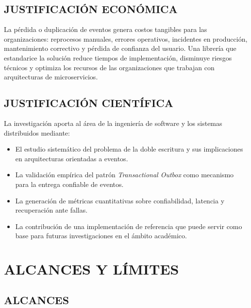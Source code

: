 \subsection{JUSTIFICACIÓN ECONÓMICA}

La pérdida o duplicación de eventos genera costos tangibles para las organizaciones: reprocesos manuales, errores operativos, incidentes en producción, mantenimiento correctivo y pérdida de confianza del usuario. Una librería que estandarice la solución reduce tiempos de implementación, disminuye riesgos técnicos y optimiza los recursos de las organizaciones que trabajan con arquitecturas de microservicios.

\subsection{JUSTIFICACIÓN CIENTÍFICA}

La investigación aporta al área de la ingeniería de software y los sistemas distribuidos mediante:

\begin{itemize}
    \item El estudio sistemático del problema de la doble escritura y sus implicaciones en arquitecturas orientadas a eventos.
    \item La validación empírica del patrón \textit{Transactional Outbox} como mecanismo para la entrega confiable de eventos.
    \item La generación de métricas cuantitativas sobre confiabilidad, latencia y recuperación ante fallas.
    \item La contribución de una implementación de referencia que puede servir como base para futuras investigaciones en el ámbito académico.
\end{itemize}

\section{ALCANCES Y LÍMITES}

\subsection{ALCANCES}

